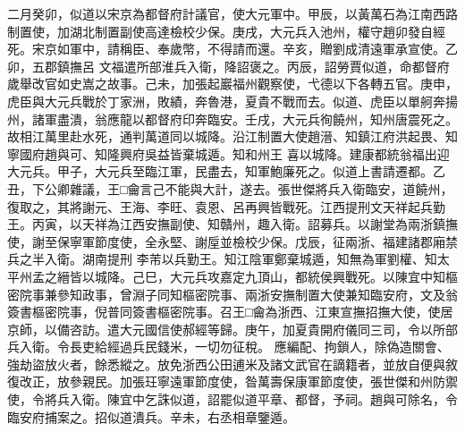 \begin{pinyinscope}
 二月癸卯，似道以宋京為都督府計議官，使大元軍中。甲辰，以黃萬石為江南西路制置使，加湖北制置副使高達檢校少保。庚戌，大元兵入池州，權守趙卯發自經死。宋京如軍中，請稱臣、奉歲幣，不得請而還。辛亥，贈劉成清遠軍承宣使。乙卯，五郡鎮撫呂
 文福遣所部淮兵入衛，降詔褒之。丙辰，詔勞賈似道，命都督府歲舉改官如史嵩之故事。己未，加張起巖福州觀察使，弋德以下各轉五官。庚申，虎臣與大元兵戰於丁家洲，敗績，奔魯港，夏貴不戰而去。似道、虎臣以單舸奔揚州，諸軍盡潰，翁應龍以都督府印奔臨安。壬戌，大元兵徇饒州，知州唐震死之。故相江萬里赴水死，通判萬道同以城降。沿江制置大使趙溍、知鎮江府洪起畏、知寧國府趙與可、知隆興府吳益皆棄城遁。知和州王
 喜以城降。建康都統翁福出迎大元兵。甲子，大元兵至臨江軍，民盡去，知軍鮑廉死之。似道上書請遷都。乙丑，下公卿雜議，王□龠言己不能與大計，遂去。張世傑將兵入衛臨安，道饒州，復取之，其將謝元、王海、李旺、袁恩、呂再興皆戰死。江西提刑文天祥起兵勤王。丙寅，以天祥為江西安撫副使、知贛州，趣入衛。詔募兵。以謝堂為兩浙鎮撫使，謝至保寧軍節度使，全永堅、謝垕並檢校少保。戊辰，征兩浙、福建諸郡廂禁兵之半入衛。湖南提刑
 李芾以兵勤王。知江陰軍鄭棄城遁，知無為軍劉權、知太平州孟之縉皆以城降。己巳，大元兵攻嘉定九頂山，都統侯興戰死。以陳宜中知樞密院事兼參知政事，曾淵子同知樞密院事、兩浙安撫制置大使兼知臨安府，文及翁簽書樞密院事，倪普同簽書樞密院事。召王□龠為浙西、江東宣撫招撫大使，使居京師，以備咨訪。遣大元國信使郝經等歸。庚午，加夏貴開府儀同三司，令以所部兵入衛。令長吏給經過兵民錢米，一切勿征稅。
 應編配、拘鎖人，除偽造關會、強劫盜放火者，餘悉縱之。放免浙西公田逋米及諸文武官在謫籍者，並放自便與敘復改正，放參親民。加張玨寧遠軍節度使，昝萬壽保康軍節度使，張世傑和州防禦使，令將兵入衛。陳宜中乞誅似道，詔罷似道平章、都督，予祠。趙與可除名，令臨安府捕案之。招似道潰兵。辛未，右丞相章鑒遁。




\end{pinyinscope}
